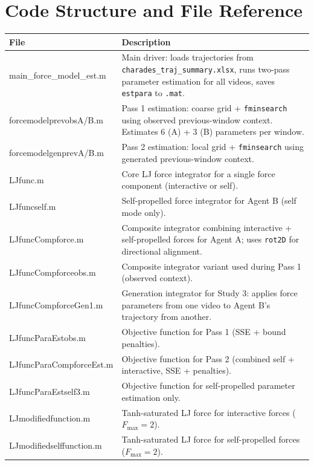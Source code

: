 \documentclass[11pt,a4paper]{article}
\begin{document}
\section{Code Structure and File Reference}

\begin{center}
\renewcommand{\arraystretch}{1.35}
\begin{tabular}{>{\ttfamily}l p{9cm}}
\toprule
\normalfont\textbf{File} & \textbf{Description} \\
\midrule
main\_force\_model\_est.m & Main driver: loads trajectories from \texttt{charades\_traj\_summary.xlsx}, runs two-pass parameter estimation for all videos, saves \texttt{estpara} to \texttt{.mat}. \\
forcemodelprevobsA/B.m & Pass 1 estimation: coarse grid + \texttt{fminsearch} using observed previous-window context. Estimates 6 (A) + 3 (B) parameters per window. \\
forcemodelgenprevA/B.m & Pass 2 estimation: local grid + \texttt{fminsearch} using generated previous-window context. \\
LJfunc.m & Core LJ force integrator for a single force component (interactive or self). \\
LJfuncself.m & Self-propelled force integrator for Agent B (self mode only). \\
LJfuncCompforce.m & Composite integrator combining interactive + self-propelled forces for Agent A; uses \texttt{rot2D} for directional alignment. \\
LJfuncCompforceobs.m & Composite integrator variant used during Pass 1 (observed context). \\
LJfuncCompforceGen1.m & Generation integrator for Study 3: applies force parameters from one video to Agent B's trajectory from another. \\
LJfuncParaEstobs.m & Objective function for Pass 1 (SSE + bound penalties). \\
LJfuncParaCompforceEst.m & Objective function for Pass 2 (combined self + interactive, SSE + penalties). \\
LJfuncParaEstself3.m & Objective function for self-propelled parameter estimation only. \\
LJmodifiedfunction.m & Tanh-saturated LJ force for interactive forces ($F_{\max} = 2$). \\
LJmodifiedselffunction.m & Tanh-saturated LJ force for self-propelled forces ($F_{\max} = 2$). \\

\end{tabular}
\end{center}
\end{document}
